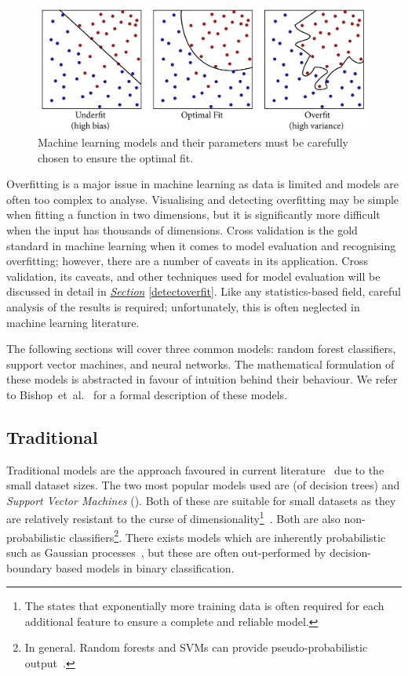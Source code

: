 \documentclass[12pt, twoside]{book}
\renewcommand\emph[1]{\textit{\color{USred}{#1}}}
\begin{document}
\begin{figure}[!htb]
\centering\includegraphics[width=0.95\linewidth]{overfit2.png}
\caption{Machine learning models and their parameters must be carefully chosen to ensure the optimal fit.}
\label{overfitex}
\vspace{-0.5em}
\end{figure}

Overfitting is a major issue in machine learning as data is limited and models are often too complex to analyse. Visualising and detecting overfitting may be simple when fitting a function in two dimensions, but it is significantly more difficult when the input has thousands of dimensions. Cross validation is the gold standard in machine learning when it comes to model evaluation and recognising overfitting; however, there are a number of caveats in its application. Cross validation, its caveats, and other techniques used for model evaluation will be discussed in detail in \textit{\hyperref[detectoverfit]{Section}} \ref{detectoverfit}. Like any statistics-based field, careful analysis of the results is required; unfortunately, this is often neglected in machine learning literature.


The following sections will cover three common models: random forest classifiers, support vector machines, and neural networks. The mathematical formulation of these models is abstracted in favour of intuition behind their behaviour. We refer to Bishop~et~al.~\cite{prml} for a formal description of these models.

 
\subsection{Traditional}
\label{traditionalmodels}
Traditional models are the approach favoured in current literature~\cite{review2013} due to the small dataset sizes. The two most popular models used are \emph{Random Forests} (of decision trees) and \textit{Support Vector Machines} (\emph{SVM}). Both of these are suitable for small datasets as they are relatively resistant to the curse of dimensionality\footnote{The \emph{curse of dimensionality} states that  exponentially more training data is often required for each additional feature to ensure a complete and reliable model.}~\cite{curseofdimensionality}. Both are also non-probabilistic classifiers\footnote{In general. Random forests and SVMs can provide pseudo-probabilistic output~\cite{svmprobabilistic}.}. There exists models which are inherently probabilistic such as Gaussian processes~\cite{rasmussen2006gaussian}, but these are often out-performed by decision-boundary based models in binary classification.
\end{document}
